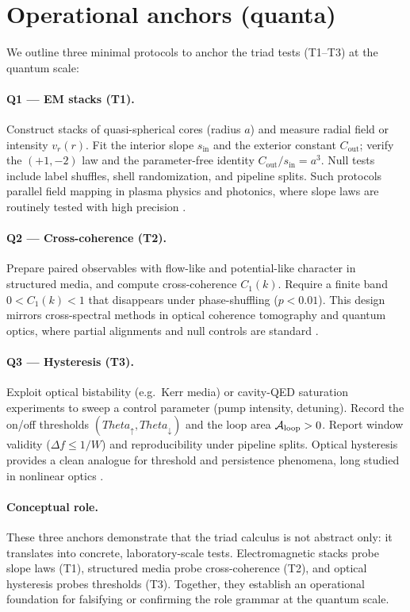 \documentclass[12pt,a4paper,oneside]{scrreprt}
\def\Theta{Theta}%
\begin{document}
\section{Operational anchors (quanta)}\label{sec:quanta-anchors}

We outline three minimal protocols to anchor the triad tests (T1–T3) at the quantum scale:

\paragraph{Q1 — EM stacks (T1).} 
Construct stacks of quasi-spherical cores (radius $a$) and measure radial field or intensity $v_r(r)$. 
Fit the interior slope $s_{\mathrm{in}}$ and the exterior constant $C_{\mathrm{out}}$; 
verify the $(+1,-2)$ law and the parameter-free identity $C_{\mathrm{out}}/s_{\mathrm{in}} = a^3$. 
Null tests include label shuffles, shell randomization, and pipeline splits. 
Such protocols parallel field mapping in plasma physics and photonics, where slope laws are routinely tested with high precision \citep{Jackson1999Classical}.

\paragraph{Q2 — Cross-coherence (T2).} 
Prepare paired observables with flow-like and potential-like character in structured media, 
and compute cross-coherence $C_1(k)$. 
Require a finite band $0 < C_1(k) < 1$ that disappears under phase-shuffling ($p < 0.01$). 
This design mirrors cross-spectral methods in optical coherence tomography 
and quantum optics, where partial alignments and null controls are standard 
\citep{Bendat2010Random,Mandel1995Optical}.

\paragraph{Q3 — Hysteresis (T3).} 
Exploit optical bistability (e.g.\ Kerr media) or cavity-QED saturation experiments 
to sweep a control parameter (pump intensity, detuning). 
Record the on/off thresholds $(\Theta_\uparrow, \Theta_\downarrow)$ 
and the loop area $\mathcal A_{\rm loop} > 0$. 
Report window validity ($\Delta f \le 1/W$) and reproducibility under pipeline splits. 
Optical hysteresis provides a clean analogue for threshold and persistence phenomena, 
long studied in nonlinear optics \citep{Gibbs1985Optical,Mabuchi2002CavityQED}.

\paragraph{Conceptual role.} 
These three anchors demonstrate that the triad calculus is not abstract only: 
it translates into concrete, laboratory-scale tests. 
Electromagnetic stacks probe slope laws (T1), 
structured media probe cross-coherence (T2), 
and optical hysteresis probes thresholds (T3). 
Together, they establish an operational foundation for falsifying or confirming 
the role grammar at the quantum scale.
\end{document}
